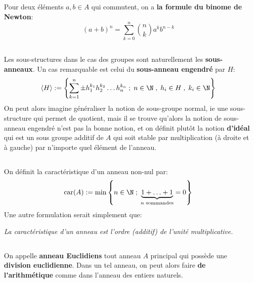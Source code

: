 \subsection*{}
Pour deux éléments \(a, b \in A\) qui commutent, on a \textbf{la formule du binome de Newton}:
\[
   (a + b)^n = \sum_{k=0}^{n}\binom{n}{k} a^k b^{n-k}   
\]
\subsection*{}
Les sous-structures dans le cas des groupes sont naturellement les \textbf{sous-anneaux}. Un cas remarquable est celui du \textbf{sous-anneau engendré} par \(H\):
\[ 
   \langle H \rangle := \left\{ \sum_{k=1}^{n} \pm h_1^{k_1}h_2^{k_2} \ldots h_n^{k_n}\; ; \; n \in \N \; , \; h_i \in H \; , \; k_i \in \N \right\}
\]
On peut alors imagine généraliser la notion de sous-groupe normal, ie une sous-structure qui permet de quotient, mais il se trouve qu'alors la notion de sous-anneau engendré n'est pas la bonne notion, et on définit plutôt la notion \textbf{d'idéal} qui est un sous groupe additif de \(A\) qui soit stable par multiplication (à droite et à gauche) par n'importe quel élément de l'anneau.

\subsection*{}
On définit la caractéristique d'un anneau non-nul par:
\[
   \text{car}(A) := \min \left\{ n \in \N \; ; \;\underbrace{1 + \ldots + 1}_{\text{\(n\) sommandes}} = 0 \right\}
\]
Une autre formulation serait simplement que:
\begin{center}
   \textit{La caractéristique d'un anneau est l'ordre (additif) de l'unité multiplicative.}
\end{center}
\subsection*{}
\subsection*{}
\subsection*{}
\subsection*{}
On appelle \textbf{anneau Euclidiens} tout anneau \(A\) principal qui possède une \textbf{division euclidienne}. Dans un tel anneau, on peut alors faire \textbf{de l'arithmétique} comme dans l'anneau des entiers naturels.
